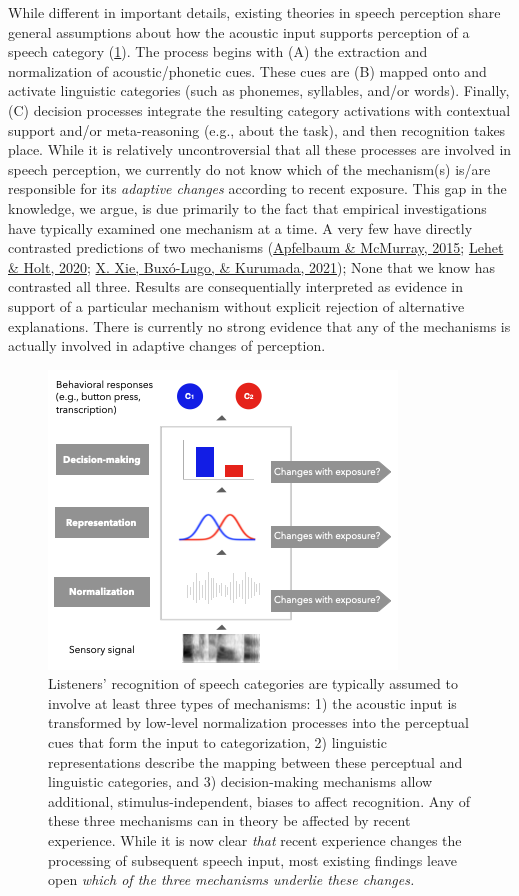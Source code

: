 \documentclass[
  11pt,
  man,floatsintext]{apa6}
\begin{document}
While different in important details, existing theories in speech perception share general assumptions about how the acoustic input supports perception of a speech category (\ref{fig:overview}). The process begins with (A) the extraction and normalization of acoustic/phonetic cues. These cues are (B) mapped onto and activate linguistic categories (such as phonemes, syllables, and/or words). Finally, (C) decision processes integrate the resulting category activations with contextual support and/or meta-reasoning (e.g., about the task), and then recognition takes place. While it is relatively uncontroversial that all these processes are involved in speech perception, we currently do not know which of the mechanism(s) is/are responsible for its \emph{adaptive changes} according to recent exposure. This gap in the knowledge, we argue, is due primarily to the fact that empirical investigations have typically examined one mechanism at a time. A very few have directly contrasted predictions of two mechanisms (\protect\hyperlink{ref-apfelbaum-mcmurray2015}{Apfelbaum \& McMurray, 2015}; \protect\hyperlink{ref-lehet-holt2020}{Lehet \& Holt, 2020}; \protect\hyperlink{ref-xie2021cognition}{X. Xie, Buxó-Lugo, \& Kurumada, 2021}); None that we know has contrasted all three. Results are consequentially interpreted as evidence in support of a particular mechanism without explicit rejection of alternative explanations. There is currently no strong evidence that any of the mechanisms is actually involved in adaptive changes of perception.

\begin{figure}[h]
\begin{center}
\includegraphics[width=0.6\columnwidth]{../figures/diagrams/overview-of-three-mechanisms2.png}
\caption{Listeners' recognition of speech categories are typically assumed to involve at least three types of mechanisms: 1) the acoustic input is transformed by low-level normalization processes into the perceptual cues that form the input to categorization, 2) linguistic representations describe the mapping between these perceptual and linguistic categories, and 3) decision-making mechanisms allow additional, stimulus-independent, biases to affect recognition. Any of these three mechanisms can in theory be affected by recent experience. While it is now clear \emph{that} recent experience changes the processing of subsequent speech input, most existing findings leave open \emph{which of the three mechanisms underlie these changes.}}\label{fig:overview}
\end{center}
\end{figure}
\end{document}
